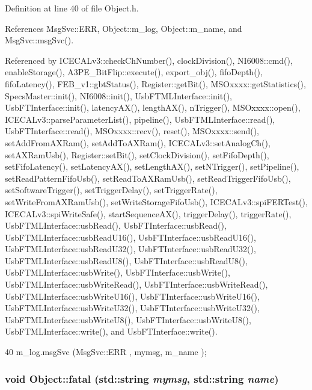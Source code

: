 Definition at line 40 of file Object.h.

References MsgSvc::ERR, Object::m\_\-log, Object::m\_\-name, and MsgSvc::msgSvc().

Referenced by ICECALv3::checkChNumber(), clockDivision(), NI6008::cmd(), enableStorage(), A3PE\_\-BitFlip::execute(), export\_\-obj(), fifoDepth(), fifoLatency(), FEB\_\-v1::gbtStatus(), Register::getBit(), MSOxxxx::getStatistics(), SpecsMaster::init(), NI6008::init(), UsbFTMLInterface::init(), UsbFTInterface::init(), latencyAX(), lengthAX(), nTrigger(), MSOxxxx::open(), ICECALv3::parseParameterList(), pipeline(), UsbFTMLInterface::read(), UsbFTInterface::read(), MSOxxxx::recv(), reset(), MSOxxxx::send(), setAddFromAXRam(), setAddToAXRam(), ICECALv3::setAnalogCh(), setAXRamUsb(), Register::setBit(), setClockDivision(), setFifoDepth(), setFifoLatency(), setLatencyAX(), setLengthAX(), setNTrigger(), setPipeline(), setReadPatternFifoUsb(), setReadToAXRamUsb(), setReadTriggerFifoUsb(), setSoftwareTrigger(), setTriggerDelay(), setTriggerRate(), setWriteFromAXRamUsb(), setWriteStorageFifoUsb(), ICECALv3::spiFERTest(), ICECALv3::spiWriteSafe(), startSequenceAX(), triggerDelay(), triggerRate(), UsbFTMLInterface::usbRead(), UsbFTInterface::usbRead(), UsbFTMLInterface::usbReadU16(), UsbFTInterface::usbReadU16(), UsbFTMLInterface::usbReadU32(), UsbFTInterface::usbReadU32(), UsbFTMLInterface::usbReadU8(), UsbFTInterface::usbReadU8(), UsbFTMLInterface::usbWrite(), UsbFTInterface::usbWrite(), UsbFTMLInterface::usbWriteRead(), UsbFTInterface::usbWriteRead(), UsbFTMLInterface::usbWriteU16(), UsbFTInterface::usbWriteU16(), UsbFTMLInterface::usbWriteU32(), UsbFTInterface::usbWriteU32(), UsbFTMLInterface::usbWriteU8(), UsbFTInterface::usbWriteU8(), UsbFTMLInterface::write(), and UsbFTInterface::write().


\begin{DoxyCode}
40 { m_log.msgSvc (MsgSvc::ERR     , mymsg, m_name ); }
\end{DoxyCode}
\hypertarget{classObject_ae62acd3d09f716220f75f252dc38bc9a}{
\subsubsection[{fatal}]{\setlength{\rightskip}{0pt plus 5cm}void Object::fatal (std::string {\em mymsg}, \/  std::string {\em name})}}
\label{classObject_ae62acd3d09f716220f75f252dc38bc9a}


